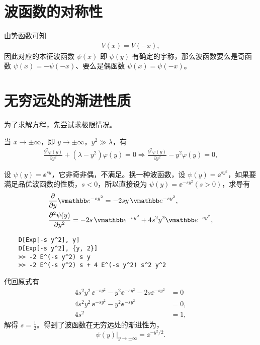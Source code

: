 \section{波函数的对称性}
由势函数可知
\begin{align}
    V(x) = V(-x),
\end{align}
因此对应的本征波函数 $\psi(x)$ 即 $\psi(y)$ 有确定的宇称，那么波函数要么是奇函数 $\psi(x) = -\psi(-x)$、要么是偶函数 $\psi(x) = \psi(-x)$。

\section{无穷远处的渐进性质}
为了求解方程，先尝试求极限情况。

当 $x \rightarrow \pm \infty$，即 $y \rightarrow \pm \infty$，$y^2 \gg \lambda$，有
\begin{align}
    \frac{\partial^2 \varphi(y)}{\partial y^2}+\left(\lambda-y^2\right) \varphi(y)=0 \Rightarrow \frac{\partial^2 \varphi(y)}{\partial y^2}-y^2 \varphi(y)=0,
\end{align}

设 $\psi(y) = \ee^{sy}$，它非奇非偶，不满足。换一种波函数，设 $\psi(y) = \ee^{sy^2}$，如果要满足品优波函数的性质，$s<0$，所以直接设为 $\psi(y) = \ee^{-sy^2} (s>0)$，求导有
\begin{align}
    &\frac{\partial}{\partial y} \ee^{-sy^2} = -2sy \, \ee^{-sy^2}, \\
    &\pdv[2]{\psi(y)}{y} = -2 s\, \ee^{-s y^2} + 4 s^2 y^2 \ee^{-s y^2},
\end{align}
\begin{lstlisting}
    D[Exp[-s y^2], y]
    D[Exp[-s y^2], {y, 2}]
    >> -2 E^(-s y^2) s y
    >> -2 E^(-s y^2) s + 4 E^(-s y^2) s^2 y^2
    \end{lstlisting}
代回原式有
\begin{align}
    4s^2 y^2 \, \ee^{-sy^2} - y^2 \ee^{-sy^2} - 2 s \ee^{-sy^2} &= 0 \\
    4s^2 y^2 \, \ee^{-sy^2} - y^2 \ee^{-sy^2} &= 0, \\
    4 s^2 & = 1,
\end{align}
解得 $s = \frac12$。得到了波函数在无穷远处的渐进性为，
\begin{equation}
    \psi(y) |_{y \rightarrow \pm\infty} = \ee^{-y^2/2}.
\end{equation}

